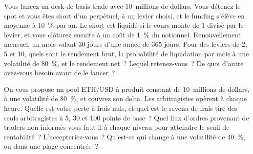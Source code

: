 \begin{question}\label{iq:iv2:crypto-for-traders-and-researchers:29}
Vous lancez un desk de basis trade avec 10~millions de dollars. Vous détenez le spot et vous êtes short d'un perpétuel, à un levier choisi, et le funding s'élève en moyenne à 10~\% par an. Le short est liquidé si le cours monte de 1 divisé par le levier, et vous clôturez ensuite à un coût de 1~\% du notionnel. Renouvellement mensuel, un mois valant 30 jours d'une année de 365 jours. Pour des leviers de 2, 5 et 10, quels sont le rendement brut, la probabilité de liquidation par mois à une volatilité de 80~\%, et le rendement net~? Lequel retenez-vous~? De quoi d'autre avez-vous besoin avant de le lancer~?
\end{question}

\begin{question}\label{iq:iv2:crypto-for-traders-and-researchers:30}
On vous propose un pool ETH/USD à produit constant de 10~millions de dollars, à une volatilité de 80~\%, et couvrez son delta. Les arbitragistes opèrent à chaque heure. Quelle est votre perte à frais nuls, et quel est le revenu de frais tiré des seuls arbitragistes à 5, 30 et 100 points de base~? Quel flux d'ordres provenant de traders non informés vous faut-il à chaque niveau pour atteindre le seuil de rentabilité~? L'accepteriez-vous~? Qu'est-ce qui change à une volatilité de 40~\%, ou dans une plage concentrée~?
\end{question}
